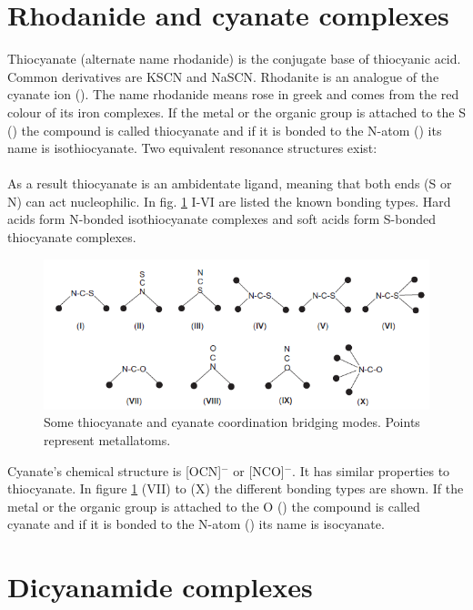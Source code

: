 \section{Rhodanide and cyanate complexes}
Thiocyanate (alternate name rhodanide) is the conjugate base of thiocyanic acid. Common derivatives are KSCN and NaSCN. Rhodanite is an analogue of the cyanate ion (). The name rhodanide means rose in greek  and comes from the red colour of its iron complexes. If the metal or the organic group is attached to the S () the compound is called thiocyanate and if it is bonded to the N-atom () its name is isothiocyanate. \cite{guy1977} Two equivalent resonance structures exist:\\
 \\
As a result thiocyanate is an ambidentate ligand, meaning that both ends (S or N) can act nucleophilic. In fig. \ref{fig:ocnscn} I-VI are listed the known bonding types. Hard acids form N-bonded isothiocyanate complexes and soft acids form S-bonded thiocyanate complexes.\cite{holub}  \\
\begin{figure}[htpb!]
\centering
\includegraphics[width=1\textwidth]{figures/schemeocnscn.png}
\caption{Some thiocyanate and cyanate coordination bridging modes. Points represent metallatoms. \cite{fam}}
\label{fig:ocnscn}
\end{figure}

Cyanate's chemical structure is [OCN]$^-$ or [NCO]$^-$. It has similar properties to thiocyanate. In figure \ref{fig:ocnscn} (VII) to (X) the different bonding types are shown.  If the metal or the organic group is attached to the O () the compound is called cyanate and if it is bonded to the N-atom () its name is isocyanate. \cite{holub}


\section{Dicyanamide complexes}




